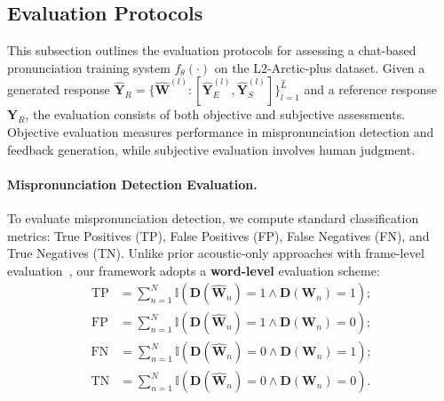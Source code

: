 \documentclass[11pt]{article}
\begin{document}
\subsection{Evaluation Protocols}

This subsection outlines the evaluation protocols for assessing a chat-based pronunciation training system $f_{\theta}(\cdot)$ on the L2-Arctic-plus dataset. Given a generated response $\hat{\boldsymbol{Y}}_R=\{\hat{\boldsymbol{W}}^{(l)}\colon[\hat{\boldsymbol{Y}}_E^{(l)}\textrm{,}\,\hat{\boldsymbol{Y}}_S^{(l)}]\}_{l=1}^{\hat{L}}$ and a reference response $\boldsymbol{Y}_R$, the evaluation consists of both objective and subjective assessments. Objective evaluation measures performance in mispronunciation detection and feedback generation, while subjective evaluation involves human judgment.

\paragraph{Mispronunciation Detection Evaluation.}
To evaluate mispronunciation detection, we compute standard classification metrics: True Positives (TP), False Positives (FP), False Negatives (FN), and True Negatives (TN). Unlike prior acoustic-only approaches with frame-level evaluation~\cite{gopwav2vec}, our framework adopts a \textbf{word-level} evaluation scheme:
\begin{align}
    \text{TP} &= \sum_{n=1}^{N} \mathbb{I}(\boldsymbol{D}(\hat{\boldsymbol{W}}_n) = 1 \wedge \boldsymbol{D}(\boldsymbol{W}_n) = 1)\textrm{;}\\
    \text{FP} &= \sum_{n=1}^{N} \mathbb{I}(\boldsymbol{D}(\hat{\boldsymbol{W}}_n) = 1 \wedge \boldsymbol{D}(\boldsymbol{W}_n) = 0)\textrm{;}
\end{align}
\begin{align}
    \text{FN} &= \sum_{n=1}^{N} \mathbb{I}(\boldsymbol{D}(\hat{\boldsymbol{W}}_n) = 0 \wedge \boldsymbol{D}(\boldsymbol{W}_n) = 1)\textrm{;}\\
    \text{TN} &= \sum_{n=1}^{N} \mathbb{I}(\boldsymbol{D}(\hat{\boldsymbol{W}}_n) = 0 \wedge \boldsymbol{D}(\boldsymbol{W}_n) = 0)\textrm{.}
\end{align}
\end{document}
